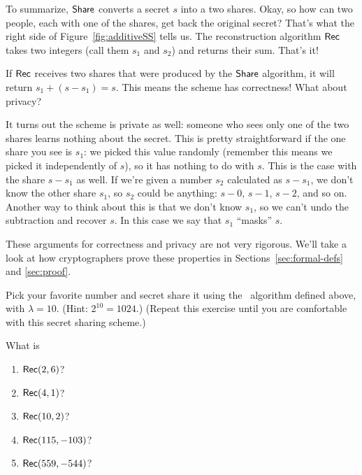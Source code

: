 To summarize, $\mathsf{Share}$ converts a secret $s$ into a two shares. Okay, so how can 
two people, each with one of the shares, get back the original secret? That's
what the right side of Figure~\ref{fig:additiveSS} tells us. The reconstruction 
algorithm $\mathsf{Rec}$ takes two integers (call them $s_1$ and $s_2$) and returns their 
sum. That's it!

If $\mathsf{Rec}$ receives two shares that were produced by the $\mathsf{Share}$ algorithm, 
it will return $s_1 + (s-s_1) = s$. This means the scheme has correctness!
What about privacy? 

It turns out the scheme is private as well: someone who sees only one of the two 
shares learns nothing about the secret. This is pretty straightforward if the 
one share you see is $s_1$: we picked this value randomly (remember this means 
we picked it independently of $s$), so it has nothing to do with $s$. This 
is the case with the share $s-s_1$ as well. If we're given a number $s_2$ 
calculated as $s-s_1$, we don't know the other share $s_1$, so $s_2$ could 
be anything: $s-0$, $s-1$, $s-2$, and so on. Another way to think about this 
is that we don't know $s_1$, so we can't undo the subtraction and recover $s$.
In this case we say that $s_1$ ``masks'' $s$.

These arguments for correctness and privacy are not very rigorous. We'll 
take a look at how cryptographers prove these properties in Sections~\ref{sec:formal-defs} 
and \ref{sec:proof}.

\begin{exercise}
    Pick your favorite number and secret share it using the \share~algorithm 
    defined above, with $\lambda=10$. (Hint: $2^{10}=1024$.)
    (Repeat this exercise until you are comfortable with this secret sharing 
    scheme.)
\end{exercise}

\begin{exercise}
    What is
    \renewcommand{\labelenumi}{(\alph{enumi})} 
    \begin{enumerate}%
        \item $\mathsf{Rec}(2, 6)$?
        \item $\mathsf{Rec}(4, 1)$?
        \item $\mathsf{Rec}(10, 2)$?
        \item $\mathsf{Rec}(115, -103)$?
        \item $\mathsf{Rec}(559, -544)$?
    \end{enumerate}
\end{exercise}


